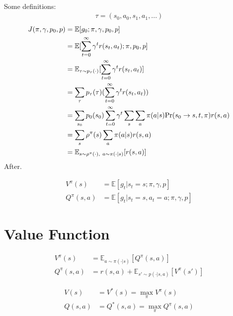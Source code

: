 \begin{solution}\ \\
Some definitions:
\begin{align*}
    \tau = (s_0,a_0,s_1,a_1,...)
\end{align*}
\begin{align*}
    J(\pi, \gamma, p_0, p) &= \mathbb{E}[ g_0 ;\pi, \gamma, p_0, p] \\
    &= \mathbb{E}[ \sum_{t=0}^{\infty}\gamma^{t}r(s_t,a_t) ;\pi, p_0, p] \\
    &= \mathbb{E}_{\tau \sim p_{\tau}(\cdot)}[ \sum_{t=0}^{\infty}\gamma^{t}r(s_t,a_t) ] \\
    &= \sum_{\tau} p_{\tau}(\tau) (\sum_{t=0}^{\infty}\gamma^{t}r(s_t,a_t)) \\
    &= \sum_{s_0} p_0(s_0) \sum_{t=0}^{\infty}\gamma^{t} \sum_s\sum_a \pi(a|s) {\rm{Pr}}(s_0\to s,t,\pi) r(s,a) \\
    &= \sum_{s} \rho^{\pi}(s) \sum_{a} \pi(a|s) r(s,a) \\
    &= \mathbb{E}_{s \sim \rho^{\pi}(\cdot), \ a \sim \pi(\cdot|s)}[r(s,a)]
\end{align*}
After.
\end{solution}






\begin{align*}
    V^{\pi}(s) &= \mathbb{E}[g_t | s_t=s; \pi, \gamma, p] \\
    Q^{\pi}(s,a) &= \mathbb{E}[g_t | s_t=s, a_t=a; \pi, \gamma, p]
\end{align*}



\section{Value Function}

 
\begin{align*}
    V^{\pi}(s) &= \mathbb{E}_{a \sim \pi(\cdot|s)}[Q^{\pi}(s,a)] \\
    Q^{\pi}(s,a)&= r(s,a) + \mathbb{E}_{s' \sim p(\cdot|s,a)}[V^{\pi}(s')]
\end{align*}




\begin{align*}
    V(s) &= V^{*}(s) = \max_{\pi}V^{\pi}(s) \\
    Q(s,a) &= Q^{*}(s,a) = \max_{\pi}Q^{\pi}(s,a)
\end{align*}



